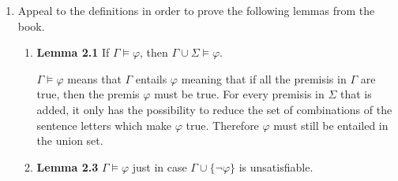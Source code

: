 \documentclass[12pt]{article}
\newcommand{\set}[1]{\lbrace#1\rbrace} %
\newcommand{\answer}[1]{%
  \par\noindent
  \begin{tcolorbox}[colback=gray!10, colframe=gray!80, title=Proof]
    #1
  \end{tcolorbox}
}
\begin{document}
\begin{enumerate}
{    %

    }
  \item Appeal to the definitions in order to prove the following lemmas from the book.
    \begin{enumerate}
      \item {\bf Lemma 2.1} If $\Gamma \vDash \varphi$, then $\Gamma \cup \Sigma \vDash \varphi$.
        \answer{
          $\Gamma \vDash \varphi$ means that $\Gamma$ entails $\varphi$ meaning that if all the
          premisis in $\Gamma$ are true, then the premis $\varphi$ must be true.
          For every premisis in $\Sigma$ that is added, it only has the possibility to reduce the
          set of combinations of the sentence letters which make $\varphi$ true. Therefore $\varphi$
          must still be entailed in the union set.
        }
      \item {\bf Lemma 2.3} $\Gamma \vDash \varphi$ just in case $\Gamma \cup \set{\neg \varphi}$ is unsatisfiable.
        \answer{

}
\end{enumerate}
\end{enumerate}
\end{document}
